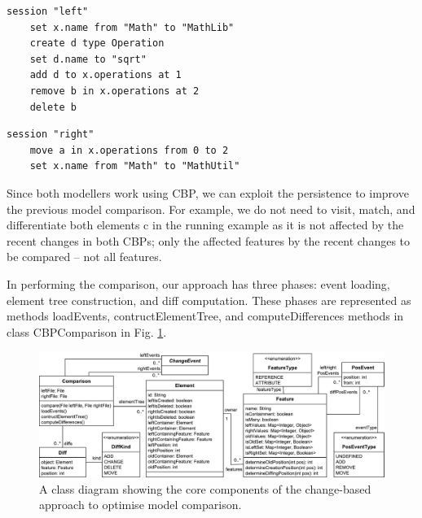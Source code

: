 \documentclass{jot}
\begin{document}
\begin{minipage}[t]{0.49\linewidth}    
    \begin{lstlisting}[firstnumber=13,style=eol,caption={The CBP of the model in Fig. \ref{fig:left} (left version).},label=lst:leftcbp]
    session "left"
    set x.name from "Math" to "MathLib"
    create d type Operation
    set d.name to "sqrt"
    add d to x.operations at 1
    remove b in x.operations at 2
    delete b
    \end{lstlisting}
\end{minipage}
\hfill
\begin{minipage}[t]{0.49\linewidth}
    \begin{lstlisting}[firstnumber=13,style=eol,caption={The CBP of the model in Fig. \ref{fig:right} (right version).},label=lst:rightcbp]
    session "right"
    move a in x.operations from 0 to 2
    set x.name from "Math" to "MathUtil"
    \end{lstlisting}
\end{minipage}

Since both modellers work using CBP, we can exploit the persistence to improve the previous model comparison. For example, we do not need to visit, match, and differentiate both elements \textsf{c} in the running example as it is not affected by the recent changes in both CBPs; only the affected features by the recent changes to be compared -- not all features. 

In performing the comparison, our approach has three phases: event loading, element tree construction, and diff computation. These phases are represented as methods \textsf{loadEvents}, \textsf{contructElementTree}, and \textsf{computeDifferences} methods in class \textsf{CBPComparison} in Fig. \ref{fig:approach_class_diagram}. 

\vspace{-10pt}
\begin{figure}
    \includegraphics[width=\linewidth]{TreeClassDiagram}
    \caption{A class diagram showing the core components of the change-based approach to optimise model comparison.}
    \label{fig:approach_class_diagram}
\end{figure}
\end{document}
